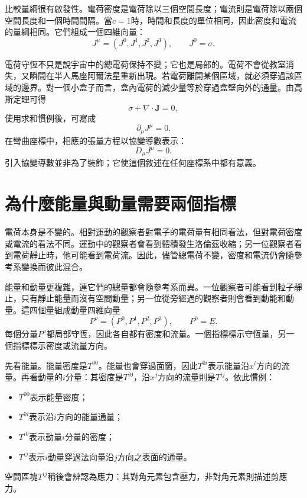 比較量綱很有啟發性。電荷密度是電荷除以三個空間長度；電流則是電荷除以兩個空間長度和一個時間間隔。當\(c=1\)時，時間和長度的單位相同，因此密度和電流的量綱相同。它們組成一個四維向量：
\begin{equation}
 J^\mu=(J^0,J^1,J^2,J^3),
 \qquad J^0=\sigma.
\end{equation}

電荷守恆不只是說宇宙中的總電荷保持不變；它也是局部的。電荷不會從教室消失，又瞬間在半人馬座阿爾法星重新出現。若電荷離開某個區域，就必須穿過該區域的邊界。對一個小盒子而言，盒內電荷的減少量等於穿過盒壁向外的通量。由高斯定理可得
\begin{equation}
 \dot{\sigma}+\nabla\cdot\mathbf{J}=0,
\end{equation}
使用求和慣例後，可寫成
\begin{equation}
 \partial_\mu J^\mu=0.
 \label{eq:charge-continuity}
\end{equation}
在彎曲座標中，相應的張量方程以協變導數表示：
\begin{equation}
 D_\mu J^\mu=0.
\end{equation}
引入協變導數並非為了裝飾；它使這個敘述在任何座標系中都有意義。

\section{為什麼能量與動量需要兩個指標}

電荷本身是不變的。相對運動的觀察者對電子的電荷量有相同看法，但對電荷密度或電流的看法不同。運動中的觀察者會看到體積發生洛倫茲收縮；另一位觀察者看到電荷靜止時，他可能看到電荷流。因此，儘管總電荷不變，密度和電流仍會隨參考系變換而彼此混合。

能量和動量更複雜，連它們的總量都會隨參考系而異。一位觀察者可能看到粒子靜止，只有靜止能量而沒有空間動量；另一位從旁經過的觀察者則會看到動能和動量。這四個量組成動量四維向量
\begin{equation}
 P^\nu=(P^0,P^1,P^2,P^3),
 \qquad P^0=E.
\end{equation}
每個分量\(P^\nu\)都局部守恆，因此各自都有密度和流量。一個指標標示守恆量，另一個指標標示密度或流量方向。

先看能量。能量密度是\(T^{00}\)。能量也會穿過面窗，因此\(T^{0i}\)表示能量沿\(x^i\)方向的流量。再看動量的\(i\)分量：其密度是\(T^{i0}\)，沿\(x^j\)方向的流量則是\(T^{ij}\)。依此慣例：
\begin{itemize}
 \item \(T^{00}\)表示能量密度；
 \item \(T^{0i}\)表示沿\(i\)方向的能量通量；
 \item \(T^{i0}\)表示動量\(i\)分量的密度；
 \item \(T^{ij}\)表示\(i\)動量穿過法向量沿\(j\)方向之表面的通量。
\end{itemize}
空間區塊\(T^{ij}\)稍後會辨認為應力：其對角元素包含壓力，非對角元素則描述剪應力。


